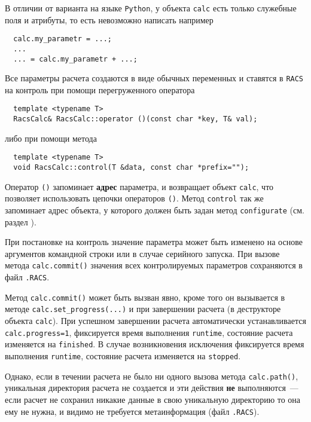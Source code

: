 В отличии от варианта на языке \verb'Python', у  объекта \verb'calc'
есть только служебные поля и атрибуты, то есть невозможно написать например
\begin{verbatim}
  calc.my_parametr = ...;
  ...
  ... = calc.my_parametr + ...;
\end{verbatim}
Все параметры расчета создаются в виде обычных переменных и ставятся в \verb'RACS'
на контроль при помощи перегруженного оператора 
\begin{verbatim}
  template <typename T>
  RacsCalc& RacsCalc::operator ()(const char *key, T& val);
\end{verbatim}
либо при помощи метода
\begin{verbatim}
  template <typename T> 
  void RacsCalc::control(T &data, const char *prefix="");
\end{verbatim}

Оператор \verb'()' запоминает {\bf адрес} параметра, и возвращает объект \verb'calc',
что позволяет использовать цепочки операторов \verb'()'. Метод \verb'control'
так же запоминает адрес объекта, у которого должен быть задан метод \verb'configurate' (см. раздел \label{ibjconf:sec}).

При постановке на контроль значение параметра может быть изменено на основе аргументов командной строки или в случае серийного запуска.
При вызове метода  \verb'calc.commit()' значения  всех контролируемых параметров сохраняются в файл \verb'.RACS'.

Метод \verb'calc.commit()' может быть вызван явно, кроме того он вызывается в методе \verb'calc.set_progress(...)' и при завершении расчета (в деструкторе объекта \verb'calc').
При успешном завершении расчета  автоматически устанавливается \verb'calc.progress=1', фиксируется время выполнения \verb'runtime',
состояние расчета изменяется на \verb'finished'. В случае возникновения исключения
фиксируется время выполнения \verb'runtime',
состояние расчета изменяется на \verb'stopped'. %

Однако, если в течении расчета не было ни одного вызова метода \verb'calc.path()',
уникальная директория расчета не создается и эти действия {\bf не} выполняются~--- если расчет не сохранил никакие данные в
свою уникальную директорию то она ему не нужна, и видимо не требуется метаинформация (файл \verb'.RACS'). 

